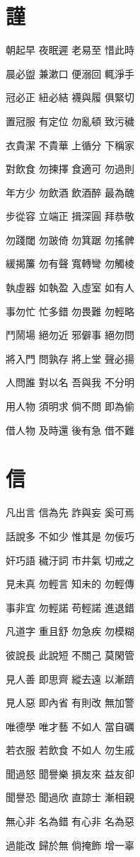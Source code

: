 \documentclass[12pt,a4paper]{ctexbook}
\begin{document}
\section{謹}
朝起早 夜眠遲 老易至 惜此時\par
晨必盥 兼漱口 便溺回 輒淨手\par
冠必正 紐必結 襪與履 俱緊切\par
置冠服 有定位 勿亂頓 致污穢\par
衣貴潔 不貴華 上循分 下稱家\par
對飲食 勿揀擇 食適可 勿過則\par
年方少 勿飲酒 飲酒醉 最為醜\par
步從容 立端正 揖深圓 拜恭敬\par
勿踐閾 勿跛倚 勿箕踞 勿搖髀\par
緩揭簾 勿有聲 寬轉彎 勿觸棱\par
執虛器 如執盈 入虛室 如有人\par
事勿忙 忙多錯 勿畏難 勿輕略\par
鬥鬧場 絕勿近 邪僻事 絕勿問\par
將入門 問孰存 將上堂 聲必揚\par
人問誰 對以名 吾與我 不分明\par
用人物 須明求 倘不問 即為偷\par
借人物 及時還 後有急 借不難\par

\section{信}
凡出言 信為先 詐與妄 奚可焉\par
話說多 不如少 惟其是 勿佞巧\par
奸巧語 穢汙詞 市井氣 切戒之\par
見未真 勿輕言 知未的 勿輕傳\par
事非宜 勿輕諾 苟輕諾 進退錯\par
凡道字 重且舒 勿急疾 勿模糊\par
彼說長 此說短 不關己 莫閑管\par
見人善 即思齊 縱去遠 以漸躋\par
見人惡 即內省 有則改 無加警\par
唯德學 唯才藝 不如人 當自礪\par
若衣服 若飲食 不如人 勿生戚\par
聞過怒 聞譽樂 損友來 益友卻\par
聞譽恐 聞過欣 直諒士 漸相親\par
無心非 名為錯 有心非 名為惡\par
過能改 歸於無 倘掩飾 增一辜\par
\end{document}
